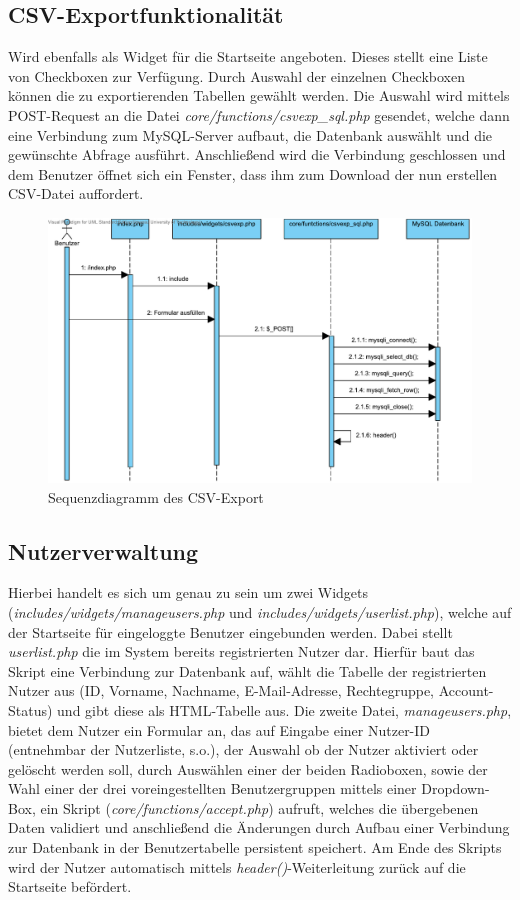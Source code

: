 \documentclass[fontsize = 12pt, paper = a4]{scrreprt}
\begin{document}
\newpage
\subsection{CSV-Exportfunktionalität}
Wird ebenfalls als Widget für die Startseite angeboten. Dieses stellt eine Liste von Checkboxen zur Verfügung. Durch Auswahl der einzelnen Checkboxen können die zu exportierenden Tabellen gewählt werden. Die Auswahl wird mittels POST-Request an die Datei \textit{core/functions/csvexp\_sql.php} gesendet, welche dann eine Verbindung zum MySQL-Server aufbaut, die Datenbank auswählt und die gewünschte Abfrage ausführt. Anschließend wird die Verbindung geschlossen und dem Benutzer öffnet sich ein Fenster, dass ihm zum Download der nun erstellen CSV-Datei auffordert.

\begin{figure}[h]
\centering
\includegraphics[scale = 0.6]{csvexport}
\caption[Sequenzdiagramm des CSV-Export]{Sequenzdiagramm des CSV-Export}
\label{csv}
\end{figure}

\newpage
\subsection{Nutzerverwaltung}
Hierbei handelt es sich um genau zu sein um zwei Widgets (\textit{includes/widgets/manageusers.php} und \textit{includes/widgets/userlist.php}), welche auf der Startseite für eingeloggte Benutzer eingebunden werden. Dabei stellt \textit{userlist.php} die im System bereits registrierten Nutzer dar. Hierfür baut das Skript eine Verbindung zur Datenbank auf, wählt die Tabelle der registrierten Nutzer aus (ID, Vorname, Nachname, E-Mail-Adresse, Rechtegruppe, Account-Status) und gibt diese als HTML-Tabelle aus. Die zweite Datei, \textit{manageusers.php}, bietet dem Nutzer ein Formular an, das auf Eingabe einer Nutzer-ID (entnehmbar der Nutzerliste, s.o.), der Auswahl ob der Nutzer aktiviert oder gelöscht werden soll, durch Auswählen einer der beiden Radioboxen, sowie der Wahl einer der drei voreingestellten Benutzergruppen mittels einer Dropdown-Box, ein Skript (\textit{core/functions/accept.php}) aufruft, welches die übergebenen Daten validiert und anschließend die Änderungen durch Aufbau einer Verbindung zur Datenbank in der Benutzertabelle persistent speichert. Am Ende des Skripts wird der Nutzer automatisch mittels \textit{header()}-Weiterleitung zurück auf die Startseite befördert.
\end{document}
